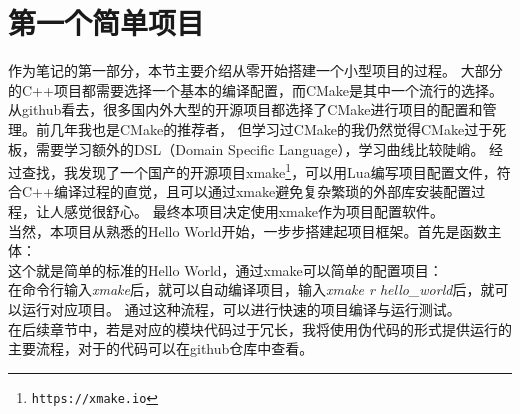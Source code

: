 \section{第一个简单项目}
作为笔记的第一部分，本节主要介绍从零开始搭建一个小型项目的过程。
大部分的C++项目都需要选择一个基本的编译配置，而CMake是其中一个流行的选择。
从github看去，很多国内外大型的开源项目都选择了CMake进行项目的配置和管理。前几年我也是CMake的推荐者，
但学习过CMake的我仍然觉得CMake过于死板，需要学习额外的DSL（Domain Specific Language），学习曲线比较陡峭。
经过查找，我发现了一个国产的开源项目xmake\footnote{\nolinkurl{https://xmake.io}}，可以用Lua编写项目配置文件，符合C++编译过程的直觉，且可以通过xmake避免复杂繁琐的外部库安装配置过程，让人感觉很舒心。
最终本项目决定使用xmake作为项目配置软件。\\

当然，本项目从熟悉的Hello World开始，一步步搭建起项目框架。首先是函数主体：\\



这个就是简单的标准的Hello World，通过xmake可以简单的配置项目：\\



在命令行输入\emph{xmake}后，就可以自动编译项目，输入\emph{xmake r hello\_world}后，就可以运行对应项目。
通过这种流程，可以进行快速的项目编译与运行测试。\\

在后续章节中，若是对应的模块代码过于冗长，我将使用伪代码的形式提供运行的主要流程，对于的代码可以在github仓库中查看。
